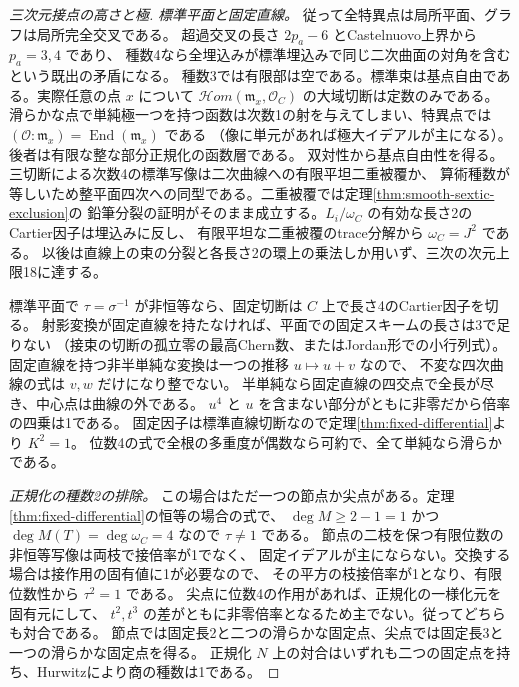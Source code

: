 \begin{proof}[三次元接点の高さと極]
\smallskip
\noindent\textit{標準平面と固定直線。}
従って全特異点は局所平面、グラフは局所完全交叉である。
超過交叉の長さ $2p_a-6$ とCastelnuovo上界から $p_a=3,4$ であり、
種数4なら全埋込みが標準埋込みで同じ二次曲面の対角を含むという既出の矛盾になる。
種数3では有限部は空である。標準束は基点自由である。実際任意の点 $x$ について
$\mathcal Hom(\mathfrak m_x,\mathcal O_C)$ の大域切断は定数のみである。
滑らかな点で単純極一つを持つ函数は次数1の射を与えてしまい、特異点では
$(\mathcal O:\mathfrak m_x)=\operatorname{End}(\mathfrak m_x)$ である
（像に単元があれば極大イデアルが主になる）。後者は有限な整な部分正規化の函数層である。
双対性から基点自由性を得る。三切断による次数4の標準写像は二次曲線への有限平坦二重被覆か、
算術種数が等しいため整平面四次への同型である。二重被覆では定理\ref{thm:smooth-sextic-exclusion}の
鉛筆分裂の証明がそのまま成立する。$L_i/\omega_C$ の有効な長さ2のCartier因子は埋込みに反し、
有限平坦な二重被覆のtrace分解から $\omega_C=J^2$ である。
以後は直線上の束の分裂と各長さ2の環上の乗法しか用いず、三次の次元上限18に達する。

標準平面で $\tau=\sigma^{-1}$ が非恒等なら、固定切断は $C$ 上で長さ4のCartier因子を切る。
射影変換が固定直線を持たなければ、平面での固定スキームの長さは3で足りない
（接束の切断の孤立零の最高Chern数、またはJordan形での小行列式）。
固定直線を持つ非半単純な変換は一つの推移 $u\mapsto u+v$ なので、
不変な四次曲線の式は $v,w$ だけになり整でない。
半単純なら固定直線の四交点で全長が尽き、中心点は曲線の外である。
$u^4$ と $u$ を含まない部分がともに非零だから倍率の四乗は1である。
固定因子は標準直線切断なので定理\ref{thm:fixed-differential}より $K^2=1$。
位数4の式で全根の多重度が偶数なら可約で、全て単純なら滑らかである。

\smallskip
\noindent\textit{正規化の種数2の排除。}
この場合はただ一つの節点か尖点がある。定理\ref{thm:fixed-differential}の恒等の場合の式で、
$\deg M\ge 2-1=1$ かつ $\deg M(T)=\deg\omega_C=4$ なので $\tau\ne1$ である。
節点の二枝を保つ有限位数の非恒等写像は両枝で接倍率が1でなく、
固定イデアルが主にならない。交換する場合は接作用の固有値に1が必要なので、
その平方の枝接倍率が1となり、有限位数性から $\tau^2=1$ である。
尖点に位数4の作用があれば、正規化の一様化元を固有元にして、
$t^2,t^3$ の差がともに非零倍率となるため主でない。従ってどちらも対合である。
節点では固定長2と二つの滑らかな固定点、尖点では固定長3と一つの滑らかな固定点を得る。
正規化 $N$ 上の対合はいずれも二つの固定点を持ち、Hurwitzにより商の種数は1である。


\end{proof}
